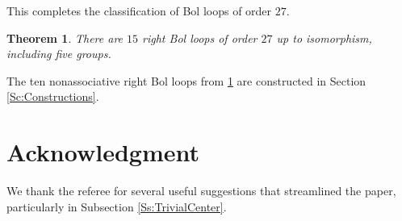 \documentclass[12pt,reqno]{amsart}
\numberwithin{equation}{section}
\theoremstyle{plain}
\newtheorem{theorem}{Theorem}[section]
\theoremstyle{definition}
\begin{document}

This completes the classification of Bol loops of order $27$.

\begin{theorem}\label{Th:Main}
There are $15$ right Bol loops of order $27$ up to isomorphism, including five groups.
\end{theorem}

The ten nonassociative right Bol loops from \cref{Th:Main} are constructed in Section \ref{Sc:Constructions}.

\section*{Acknowledgment}

We thank the referee for several useful suggestions that streamlined the paper, particularly in Subsection \ref{Ss:TrivialCenter}.
\end{document}

